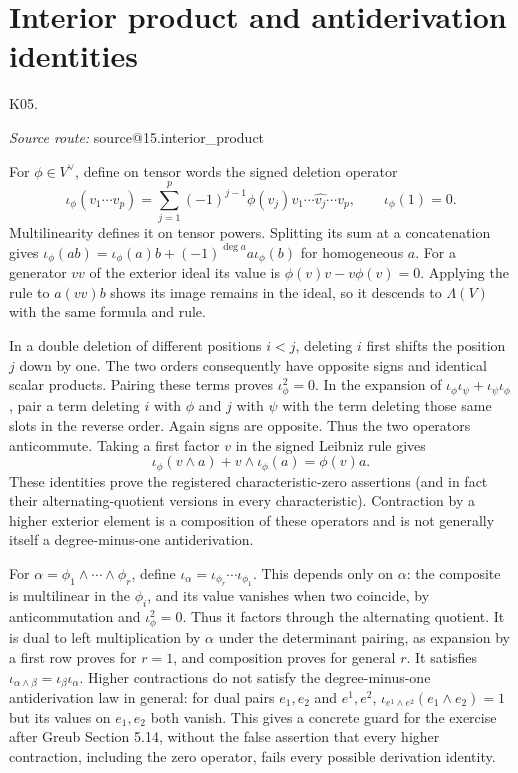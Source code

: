 \documentclass[11pt,a4paper]{book}
\makeatletter
\theoremstyle{definition}\newtheorem{definition}[theorem]{Definition}
\theoremstyle{remark}\newtheorem{remark}[theorem]{Remark}
\newcommand{\Kentry}[2]{\section{#2}\label{k:#1}\noindent\textsf{\small K05.\detokenize{#1}}\par
  \begingroup\small\color{black!65}\textit{Source route: }\csname source@#1\endcsname\par\endgroup}
\makeatother
\begin{document}
\Kentry{15.interior_product}{Interior product and antiderivation identities}
For $\phi\in V^\vee$, define on tensor words the signed deletion operator
\[
 \iota_\phi(v_1\cdots v_p)=\sum_{j=1}^p(-1)^{j-1}\phi(v_j)
 v_1\cdots\widehat{v_j}\cdots v_p,\qquad\iota_\phi(1)=0.
\]
Multilinearity defines it on tensor powers. Splitting its sum at a concatenation gives $\iota_\phi(ab)=\iota_\phi(a)b+(-1)^{\deg a}a\iota_\phi(b)$ for homogeneous $a$. For a generator $vv$ of the exterior ideal its value is $\phi(v)v-v\phi(v)=0$. Applying the rule to $a(vv)b$ shows its image remains in the ideal, so it descends to $\Lambda(V)$ with the same formula and rule.

In a double deletion of different positions $i<j$, deleting $i$ first shifts the position $j$ down by one. The two orders consequently have opposite signs and identical scalar products. Pairing these terms proves $\iota_\phi^2=0$. In the expansion of $\iota_\phi\iota_\psi+\iota_\psi\iota_\phi$, pair a term deleting $i$ with $\phi$ and $j$ with $\psi$ with the term deleting those same slots in the reverse order. Again signs are opposite. Thus the two operators anticommute. Taking a first factor $v$ in the signed Leibniz rule gives
\[
 \iota_\phi(v\wedge a)+v\wedge\iota_\phi(a)=\phi(v)a.
\]
These identities prove the registered characteristic-zero assertions (and in fact their alternating-quotient versions in every characteristic). Contraction by a higher exterior element is a composition of these operators and is not generally itself a degree-minus-one antiderivation.


For $\alpha=\phi_1\wedge\cdots\wedge\phi_r$, define $\iota_\alpha=\iota_{\phi_r}\cdots\iota_{\phi_1}$. This depends only on $\alpha$: the composite is multilinear in the $\phi_i$, and its value vanishes when two coincide, by anticommutation and $\iota_\phi^2=0$. Thus it factors through the alternating quotient. It is dual to left multiplication by $\alpha$ under the determinant pairing, as expansion by a first row proves for $r=1$, and composition proves for general $r$. It satisfies $\iota_{\alpha\wedge\beta}=\iota_\beta\iota_\alpha$. Higher contractions do not satisfy the degree-minus-one antiderivation law in general: for dual pairs $e_1,e_2$ and $e^1,e^2$, $\iota_{e^1\wedge e^2}(e_1\wedge e_2)=1$ but its values on $e_1,e_2$ both vanish. This gives a concrete guard for the exercise after Greub Section 5.14, without the false assertion that every higher contraction, including the zero operator, fails every possible derivation identity.
\end{document}

